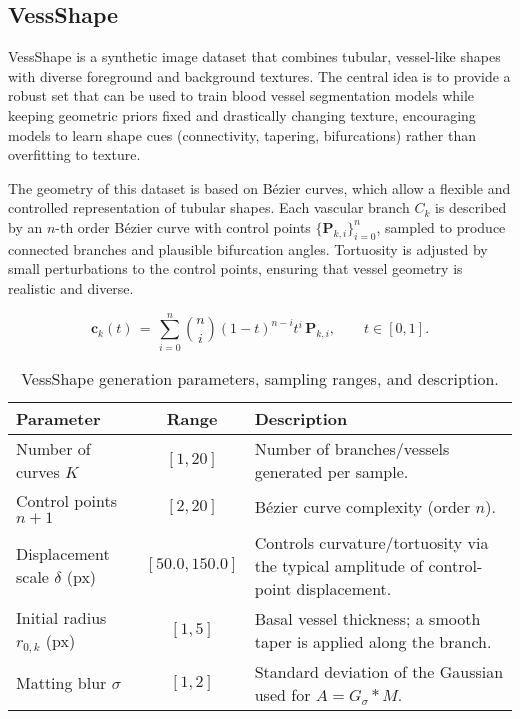 \documentclass[%
reprint,
nofootinbib,
 amsmath,amssymb,
aps,
superscriptaddress,
showkeys,
longbibliography
]{revtex4-1}
\begin{document}
\subsection{VessShape}

VessShape is a synthetic image dataset that combines tubular, vessel-like shapes with diverse foreground and background textures. The central idea is to provide a robust set that can be used to train blood vessel segmentation models while keeping geometric priors fixed and drastically changing texture, encouraging models to learn shape cues (connectivity, tapering, bifurcations) rather than overfitting to texture.

The geometry of this dataset is based on Bézier curves, which allow a flexible and controlled representation of tubular shapes. Each vascular branch $C_k$ is described by an $n$-th order Bézier curve with control points $\{\mathbf{P}_{k,i}\}_{i=0}^n$, sampled to produce connected branches and plausible bifurcation angles. Tortuosity is adjusted by small perturbations to the control points, ensuring that vessel geometry is realistic and diverse.

\begin{equation}
\mathbf{c}_k(t) \,=\, \sum_{i=0}^{n} \binom{n}{i} (1-t)^{n-i} t^{i} \, \mathbf{P}_{k,i}, \qquad t \in [0,1].
\label{eq:bezier}
\end{equation}

\begin{table*}[t]
\caption{VessShape generation parameters, sampling ranges, and description.}
\label{tab:vessshape_params}
\centering
\begin{tabularx}{\textwidth}{l c X}
\hline
    \textbf{Parameter} & \textbf{Range} & \textbf{Description} \\
\hline
Number of curves $K$ & $[1,20]$ & Number of branches/vessels generated per sample. \\
Control points $n{+}1$ & $[2,20]$ & Bézier curve complexity (order $n$). \\
Displacement scale $\delta$ (px) & $[50.0,150.0]$ & Controls curvature/tortuosity via the typical amplitude of control-point displacement. \\
Initial radius $r_{0,k}$ (px) & $[1,5]$ & Basal vessel thickness; a smooth taper is applied along the branch. \\
Matting blur $\sigma$ & $[1,2]$ & Standard deviation of the Gaussian used for $A = G_{\sigma} * M$. \\
\hline
\end{tabularx}
\end{table*}
\end{document}
